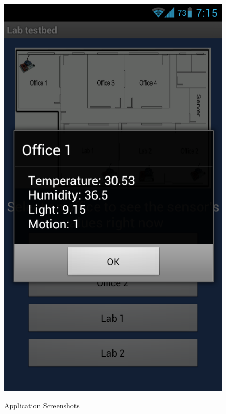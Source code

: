 \documentclass[conference]{IEEEtran}
\begin{document}
\begin{figure}[!t]
\begin{center}
{\includegraphics[width=0.5\columnwidth]{images/sensor_data_retrieved_screenshot.png}
\label{fig:screen2}}
\hspace{0.2\columnwidth}
\caption{Application Screenshots}
\label{fig:screenshots}

\end{center}
\vspace{-0.8cm}
\end{figure}
\end{document}
